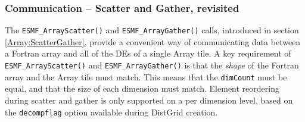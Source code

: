  
\setlength{\oldparskip}{\parskip}
\setlength{\parskip}{1.5ex}
\setlength{\oldparindent}{\parindent}
\setlength{\parindent}{0pt}
\setlength{\oldbaselineskip}{\baselineskip}
\setlength{\baselineskip}{11pt}
 
\def\bv{\begin{verbatim}}
\def\ev{\end{verbatim}}
\def\be{\begin{equation}}
\def\ee{\end{equation}}
\def\bea{\begin{eqnarray}}
\def\eea{\end{eqnarray}}
\def\bi{\begin{itemize}}
\def\ei{\end{itemize}}
\def\bn{\begin{enumerate}}
\def\en{\end{enumerate}}
\def\bd{\begin{description}}
\def\ed{\end{description}}
\def\({\left (}
\def\){\right )}
\def\[{\left [}
\def\]{\right ]}
\def\<{\left  \langle}
\def\>{\right \rangle}
\def\cI{{\cal I}}
\def\diag{\mathop{\rm diag}}
\def\tr{\mathop{\rm tr}}


 

  
   \subsubsection{Communication -- Scatter and Gather, revisited}
   \label{Array:ScatterGatherRevisited}
   
   The {\tt ESMF\_ArrayScatter()} and {\tt ESMF\_ArrayGather()} calls, 
   introduced in section \ref{Array:ScatterGather}, provide a convenient
   way of communicating data between a Fortran array and all of the DEs of
   a single Array tile. A key requirement of {\tt ESMF\_ArrayScatter()}
   and {\tt ESMF\_ArrayGather()} is that the {\em shape} of the Fortran array
   and the Array tile must match. This means that the {\tt dimCount} must be
   equal, and that the size of each dimension must match. Element reordering
   during scatter and gather is only supported on a per dimension level,
   based on the {\tt decompflag} option available during DistGrid creation.
  
